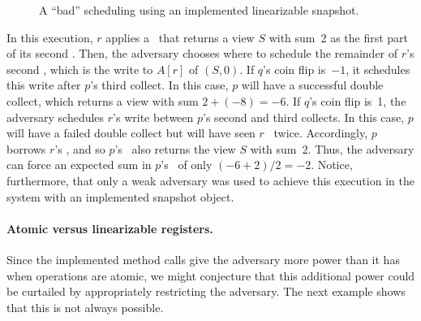 \documentclass[11pt,letterpaper]{article}
\newcommand{\xwrite}{\text{\tt write}\xspace}
\begin{document}
\begin{figure*}[htbp]
\begin{center}
\end{center}
\vspace{-1em}
\caption{A ``bad'' scheduling using an implemented linearizable snapshot.}
\label{fig:snapshot}
\end{figure*}

In this execution, $r$ applies a \Scan\ that returns a view $S$ with sum~2 as the first part of its second \Update.
Then, the adversary chooses where to schedule the remainder of $r$'s second \Update,
which is the write to $A[r]$ of $(S, 0)$.
If $q$'s coin flip is~$-1$, it schedules this write after $p$'s third collect.
In this case, $p$ will have a successful double collect, which returns a view with sum $2+(-8)=-6$.
If $q$'s coin flip is~1, the adversary schedules $r$'s write between $p$'s second and third collects.
In this case, $p$ will have a failed double collect but will have seen $r$ \Update\ twice.
Accordingly, $p$ borrows $r$'s \Scan, and so $p$'s \Scan\ also returns the view $S$ with sum~2.
Thus, the adversary can force an expected sum in $p$'s \Scan\ of only $(-6+2)/2=-2$.
Notice, furthermore, that only a weak adversary was used to achieve this execution in the system with an implemented
snapshot object.

\paragraph{Atomic versus linearizable registers.}
Since the implemented method calls give the adversary more power than it has when operations are atomic,
we might conjecture that this additional power could be curtailed by appropriately restricting the adversary.
The next example shows that this is not always possible.
\end{document}

